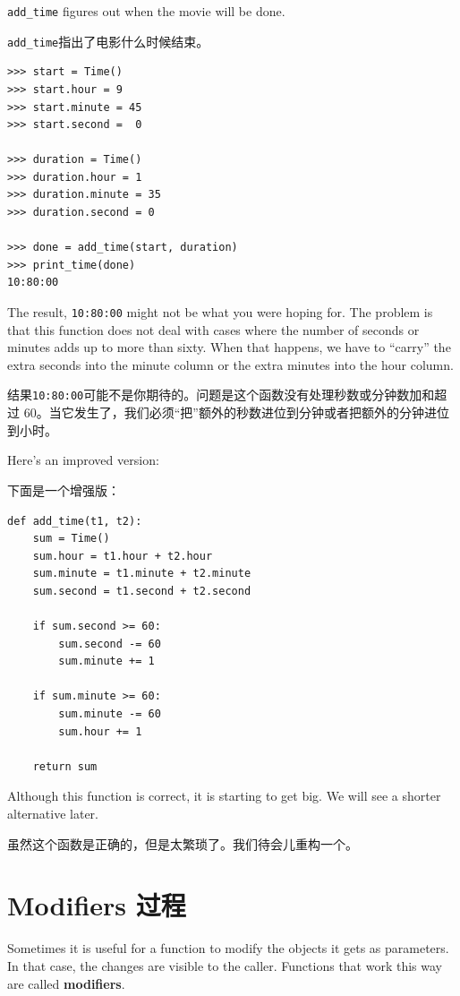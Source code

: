 \documentclass[10pt]{book}
\begin{document}
\begin{CJK}{UTF8}{gbsn}
\verb"add_time" figures out when the movie will be done.

\verb"add_time"指出了电影什么时候结束。

\begin{verbatim}
>>> start = Time()
>>> start.hour = 9
>>> start.minute = 45
>>> start.second =  0

>>> duration = Time()
>>> duration.hour = 1
>>> duration.minute = 35
>>> duration.second = 0

>>> done = add_time(start, duration)
>>> print_time(done)
10:80:00
\end{verbatim}
%
The result, {\tt 10:80:00} might not be what you were hoping
for.  The problem is that this function does not deal with cases where the
number of seconds or minutes adds up to more than sixty.  When that
happens, we have to ``carry'' the extra seconds into the minute column
or the extra minutes into the hour column.

结果{\tt 10:80:00}可能不是你期待的。问题是这个函数没有处理秒数或分钟数加和超过
60。当它发生了，我们必须``把''额外的秒数进位到分钟或者把额外的分钟进位到小时。

Here's an improved version:

下面是一个增强版：

\begin{verbatim}
def add_time(t1, t2):
    sum = Time()
    sum.hour = t1.hour + t2.hour
    sum.minute = t1.minute + t2.minute
    sum.second = t1.second + t2.second

    if sum.second >= 60:
        sum.second -= 60
        sum.minute += 1

    if sum.minute >= 60:
        sum.minute -= 60
        sum.hour += 1

    return sum
\end{verbatim}
%
Although this function is correct, it is starting to get big.
We will see a shorter alternative later.

虽然这个函数是正确的，但是太繁琐了。我们待会儿重构一个。


\section{Modifiers 过程}
\label{increment}

Sometimes it is useful for a function to modify the objects it gets as
parameters.  In that case, the changes are visible to the caller.
Functions that work this way are called {\bf modifiers}.


\end{CJK}
\end{document}
